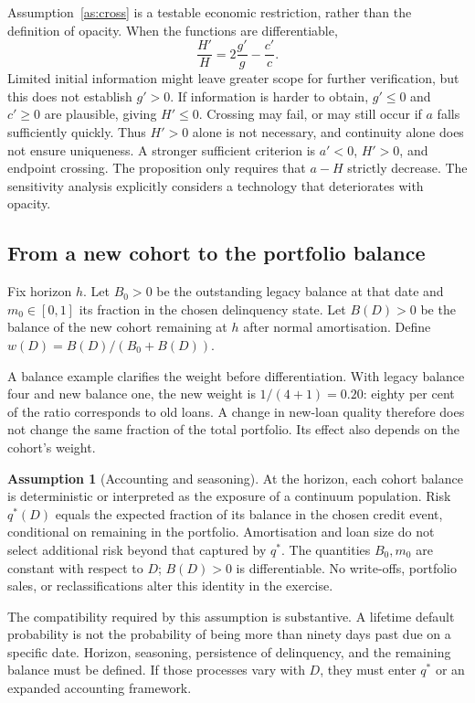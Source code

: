 \documentclass[11pt]{article}
\theoremstyle{definition}\newtheorem{assumption}{Assumption}
\begin{document}
Assumption~\ref{as:cross} is a testable economic restriction, rather than
the definition of opacity. When the functions are differentiable,
\begin{equation}\label{eq:logs}
\frac{H'}H=2\frac{g'}g-\frac{c'}c.
\end{equation}
Limited initial information might leave greater scope for further
verification, but this does not establish $g'>0$. If information is harder
to obtain, $g'\le0$ and $c'\ge0$ are plausible, giving $H'\le0$.
Crossing may fail, or may still occur if $a$ falls sufficiently quickly.
Thus $H'>0$ alone is not necessary, and continuity alone does not ensure
uniqueness. A stronger sufficient criterion is $a'<0$, $H'>0$, and endpoint
crossing. The proposition only requires that $a-H$ strictly decrease.
The sensitivity analysis explicitly considers a technology that deteriorates
with opacity.

\subsection{From a new cohort to the portfolio balance}
Fix horizon $h$. Let $B_0>0$ be the outstanding legacy balance at that date
and $m_0\in[0,1]$ its fraction in the chosen delinquency state. Let $B(D)>0$
be the balance of the new cohort remaining at $h$ after normal amortisation.
Define $w(D)=B(D)/(B_0+B(D))$.

A balance example clarifies the weight before differentiation. With legacy
balance four and new balance one, the new weight is $1/(4+1)=0.20$: eighty
per cent of the ratio corresponds to old loans. A change in new-loan quality
therefore does not change the same fraction of the total portfolio. Its
effect also depends on the cohort's weight.

\begin{assumption}[Accounting and seasoning]\label{as:stock}
At the horizon, each cohort balance is deterministic or interpreted as the
exposure of a continuum population. Risk $q^*(D)$ equals the expected fraction
of its balance in the chosen credit event, conditional on remaining in the
portfolio. Amortisation and loan size do not select additional risk beyond
that captured by $q^*$. The quantities $B_0,m_0$ are constant with respect to $D$;
$B(D)>0$ is differentiable. No write-offs, portfolio sales, or reclassifications
alter this identity in the exercise.
\end{assumption}
The compatibility required by this assumption is substantive. A lifetime
default probability is not the probability of being more than ninety days
past due on a specific date. Horizon, seasoning, persistence of delinquency,
and the remaining balance must be defined. If those processes vary with $D$,
they must enter $q^*$ or an expanded accounting framework.
\end{document}
